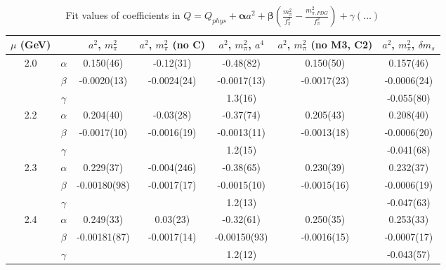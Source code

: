 \documentclass[12pt]{extarticle}
\begin{document}
\begin{table}[h!]
\begin{center}
\begin{tabular}{|c c|c|c|c|c|c|}
\hline
$\mu$ (GeV) &  & $a^2$, $m_\pi^2$& $a^2$, $m_\pi^2$ (no C)& $a^2$, $m_\pi^2$, $a^4$& $a^2$, $m_\pi^2$ (no M3, C2)& $a^2$, $m_\pi^2$, $\delta m_s$\\
\hline
\multirow{3}{0.5in}{2.0} & $\alpha$ & 0.150(46)& -0.12(31)& -0.48(82)& 0.150(50)& 0.157(46)\\
 & $\beta$ & -0.0020(13)& -0.0024(24)& -0.0017(13)& -0.0017(23)& -0.0006(24)\\
 & $\gamma$ &  &  & 1.3(16)&  & -0.055(80)\\
\hline
\multirow{3}{0.5in}{2.2} & $\alpha$ & 0.204(40)& -0.03(28)& -0.37(74)& 0.205(43)& 0.208(40)\\
 & $\beta$ & -0.0017(10)& -0.0016(19)& -0.0013(11)& -0.0013(18)& -0.0006(20)\\
 & $\gamma$ &  &  & 1.2(15)&  & -0.041(68)\\
\hline
\multirow{3}{0.5in}{2.3} & $\alpha$ & 0.229(37)& -0.004(246)& -0.38(65)& 0.230(39)& 0.232(37)\\
 & $\beta$ & -0.00180(98)& -0.0017(17)& -0.0015(10)& -0.0015(16)& -0.0006(19)\\
 & $\gamma$ &  &  & 1.2(13)&  & -0.047(63)\\
\hline
\multirow{3}{0.5in}{2.4} & $\alpha$ & 0.249(33)& 0.03(23)& -0.32(61)& 0.250(35)& 0.253(33)\\
 & $\beta$ & -0.00181(87)& -0.0017(14)& -0.00150(93)& -0.0016(15)& -0.0007(17)\\
 & $\gamma$ &  &  & 1.2(12)&  & -0.043(57)\\
\hline
\end{tabular}
\caption{Fit values of coefficients in $Q = Q_{phys} + \mathbf{\alpha} a^2 + \mathbf{\beta}\left(\frac{m_\pi^2}{f_\pi^2}-\frac{m_{\pi,PDG}^2}{f_\pi^2}\right) + \gamma(\ldots)$}
\end{center}
\end{table}




















\clearpage
\end{document}

